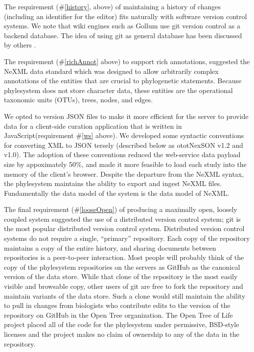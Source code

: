 \documentclass{bioinfo}
\newcommand{\ps}{phylesystem\xspace}
\newcommand{\otol}{Open Tree of Life\xspace}
\newcommand{\nexson}{otNexSON\xspace}
\newcommand{\js}{JavaScript\xspace}
\begin{document}
The requirement (\#\ref{history}, above) of maintaining a history of changes 
    (including an identifier for the editor) fits naturally with software version control systems.
We note that wiki engines such as Gollum use git version control as a backend database.
The idea of using git as general database has been discussed by others \citep{git-nosql-db}.

The requirement (\#\ref{richAnnot} above) to support rich annotations,
    suggested the NeXML data standard which was designed
    to allow arbitrarily complex annotations of the entities that are crucial to phylogenetic statements.
Because \ps does not store character data, these entities are the operational taxonomic units (OTUs), trees, nodes, and edges.

We opted to version JSON files to make it more efficient for the server to provide data for a client-side
curation application that is written in \js (requirement \#\ref{ws} above).
We developed some syntactic conventions for converting XML to JSON tersely (described below as ot\nexson v1.2 and v1.0).
The adoption of these conventions reduced the web-service data payload size by appoximately 50\%, and made it more
    feasible to load each study into the memory of the client's browser.
Despite the departure from the NeXML syntax, the \ps maintains the ability to export and ingest NeXML files.
Fundamentally the data model of the system is the data model of NeXML.

The final requirement (\#\ref{looseOpen}) of producing a maximally open,
    loosely coupled system suggested the use of a distributed
    version control system; git is the most popular distributed version control system.
Distributed version control systems do not require a single, ``primary'' repository.
Each copy of the repository maintains a copy of the entire history, and sharing documents between
    repositories is a peer-to-peer interaction.
Most people will probably think of the copy of the \ps repositories on the servers as GitHub 
    as the canonical version of the data store.
While that clone of the repository is the most easily visible and browsable copy,
    other users of git are free to fork the repository and maintain variants of the data store.
Such a clone would still maintain the ability to pull in changes from biologists who 
    contribute edits to the version of the repository on GitHub in the Open Tree organization.
The \otol project placed all of the code for the \ps under permissive, BSD-style licenses and the
    project makes no claim of ownership to any of the data in the repository.
\end{document}
